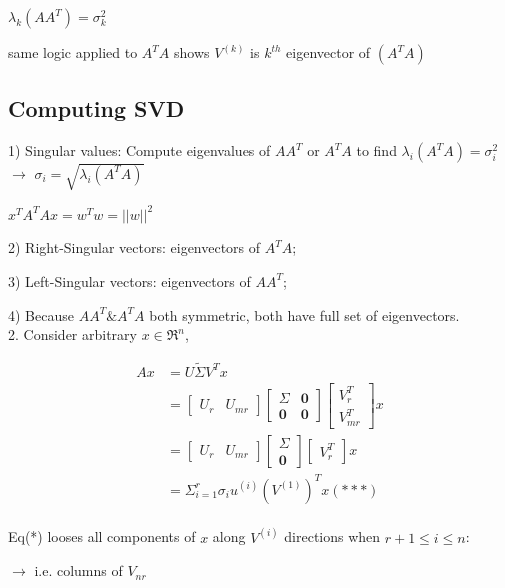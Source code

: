 $\lambda_k(AA^T) = \sigma^2_k$

same logic applied to $A^TA$ shows $V^{(k)}$ is $k^{th}$ eigenvector of $(A^TA)$


\subsection{Computing SVD}

1) Singular values: Compute eigenvalues of $AA^T$ or $A^TA$ to find $\lambda_i(A^TA) =\sigma_i^2$ $\rightarrow$ $\sigma_i = \sqrt{\lambda_i(A^TA)}$

$x^TA^TAx = w^Tw =||w||^2$

2) Right-Singular vectors: eigenvectors of $A^TA$;

3) Left-Singular vectors: eigenvectors of $AA^T$;

4) Because $AA^T \& A^TA$ both symmetric, both have full set of eigenvectors.\\

2. Consider arbitrary $x\in \Re^n$, 

\begin{align*}
Ax &= U\tilde{\Sigma} V^Tx\\
&= 
\begin{bmatrix}%
U_r & U_{mr}
\end{bmatrix}
\begin{bmatrix}%
\Sigma & \textbf{0}\\
\textbf{0}& \textbf{0}
\end{bmatrix}
\begin{bmatrix}%
V_r^T\\
V_{mr}^T
\end{bmatrix}x\\
&= 
\begin{bmatrix}%
U_r & U_{mr}
\end{bmatrix}
\begin{bmatrix}%
\Sigma\\
\textbf{0}
\end{bmatrix}
\begin{bmatrix}%
V_r^T
\end{bmatrix}x\\
&= \Sigma^r_{i=1}\sigma_iu^{(i)}(V^{(1)})^Tx (***)
\end{align*}
\\

Eq(*) looses all components of $x$ along $V^{(i)}$ directions when $r+1 \leq i \leq n$:

$\rightarrow$ i.e. columns of $V_{nr}$

